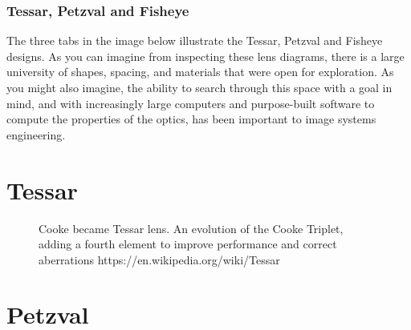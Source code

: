 \documentclass[
  letterpaper,
]{book}
\begin{document}
\subsection{Tessar, Petzval and Fisheye}\label{sec-optics-famous-lenses}

The three tabs in the image below illustrate the Tessar, Petzval and
Fisheye designs. As you can imagine from inspecting these lens diagrams,
there is a large university of shapes, spacing, and materials that were
open for exploration. As you might also imagine, the ability to search
through this space with a goal in mind, and with increasingly large
computers and purpose-built software to compute the properties of the
optics, has been important to image systems engineering.

\chapter{Tessar}

\begin{figure}


\caption{\label{fig-optics-notransverse}Cooke became Tessar lens. An
evolution of the Cooke Triplet, adding a fourth element to improve
performance and correct aberrations
https://en.wikipedia.org/wiki/Tessar}

\end{figure}%

\chapter{Petzval}
\end{document}
